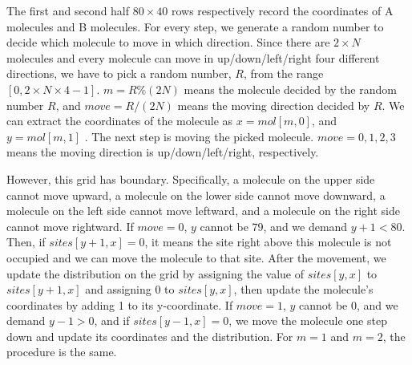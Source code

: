 \documentclass{article}
\begin{document}
The first and second half $80\times 40$ rows respectively record the coordinates of A molecules
and B molecules. For every step, we generate a random number to decide which
molecule to move in which direction. Since there are $2\times N$ molecules
and every molecule can move in up/down/left/right four different directions,
we have to pick a random number, $R$, from the range $\left[ 0,2\times
N\times 4-1\right] $. $m=R\%(2N)$ means the molecule decided by the random
number $R$, and $move=R/(2N)$ means the moving direction decided by $R$. We
can extract the coordinates of the molecule as $x=mol[m,0]$, and $y=mol[m,1]$%
. The next step is moving the picked molecule. $move=0,1,2,3$ means the
moving direction is up/down/left/right, respectively.

 However, this grid has
boundary. Specifically, a molecule on the upper side cannot move upward, a
molecule on the lower side cannot move downward, a molecule on the left side
cannot move leftward, and a molecule on the right side cannot move
rightward. If $move=0$, $y$ cannot be $79$, and we demand $y+1<80$. Then, if
$sites[y+1,x]=0$, it means the site right above this molecule is not
occupied and we can move the molecule to that site. After the movement, we update the distribution on the grid by assigning the value
of $sites[y,x]$ to $sites[y+1,x]$ and assigning $0$ to $sites[y,x]$, then update the molecule's coordinates by adding 1 to its
y-coordinate. If $%
move=1$, $y$ cannot be $0$, and we demand $y-1>0$, and if $sites[y-1,x]=0$,
we move the molecule one step down and update its coordinates and the
distribution. For $m=1$ and $m=2$, the procedure is the same.
\end{document}
